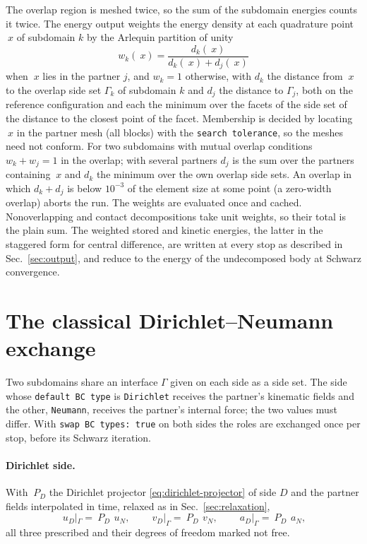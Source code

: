 \documentclass[11pt]{article}
\newcommand{\code}[1]{\texttt{#1}}
\begin{document}
The overlap region is meshed twice, so the sum of the subdomain energies
counts it twice. The energy output weights the energy density at
each quadrature point $~x$ of subdomain $k$ by the Arlequin partition of
unity
\begin{equation}
  w_k(~x) = \frac{d_k(~x)}{d_k(~x) + d_j(~x)}
  \label{eq:arlequin}
\end{equation}
when $~x$ lies in the partner $j$, and $w_k = 1$ otherwise, with $d_k$ the
distance from $~x$ to the overlap side set $\Gamma_k$ of subdomain $k$ and
$d_j$ the distance to $\Gamma_j$, both on the reference configuration and
each the minimum over the facets of the side set of the distance to the
closest point of the facet. Membership is decided by locating $~x$ in the
partner mesh (all blocks) with the \code{search tolerance}, so the meshes
need not conform. For two subdomains with mutual overlap conditions
$w_k + w_j = 1$ in the overlap; with several partners $d_j$ is the sum
over the partners containing $~x$ and $d_k$ the minimum over the own
overlap side sets. An overlap in which $d_k + d_j$ is below $10^{-3}$ of
the element size at some point (a zero-width overlap) aborts the run. The
weights are evaluated once and cached. Nonoverlapping and contact
decompositions take unit weights, so their total is the plain sum. The
weighted stored and kinetic energies, the latter in the staggered form for
central difference, are written at every stop as described in
Sec.~\ref{sec:output}, and reduce to the energy of the undecomposed body
at Schwarz convergence.

\section{The classical Dirichlet--Neumann exchange}
\label{sec:classical}

Two subdomains share an interface $\Gamma$ given on each side as a side
set. The side whose \code{default BC type} is \code{Dirichlet} receives the
partner's kinematic fields and the other, \code{Neumann}, receives the
partner's internal force; the two values must differ. With
\code{swap BC types: true} on both sides the roles are exchanged once per
stop, before its Schwarz iteration.

\paragraph{Dirichlet side.} With $~P_D$ the Dirichlet projector
\eqref{eq:dirichlet-projector} of side $D$ and the partner fields
interpolated in time, relaxed as in Sec.~\ref{sec:relaxation},
\begin{equation}
  ~u_D|_\Gamma = ~P_D\, ~u_N, \qquad
  ~v_D|_\Gamma = ~P_D\, ~v_N, \qquad
  ~a_D|_\Gamma = ~P_D\, ~a_N ,
  \label{eq:classical-dirichlet}
\end{equation}
all three prescribed and their degrees of freedom marked not free.
\end{document}
